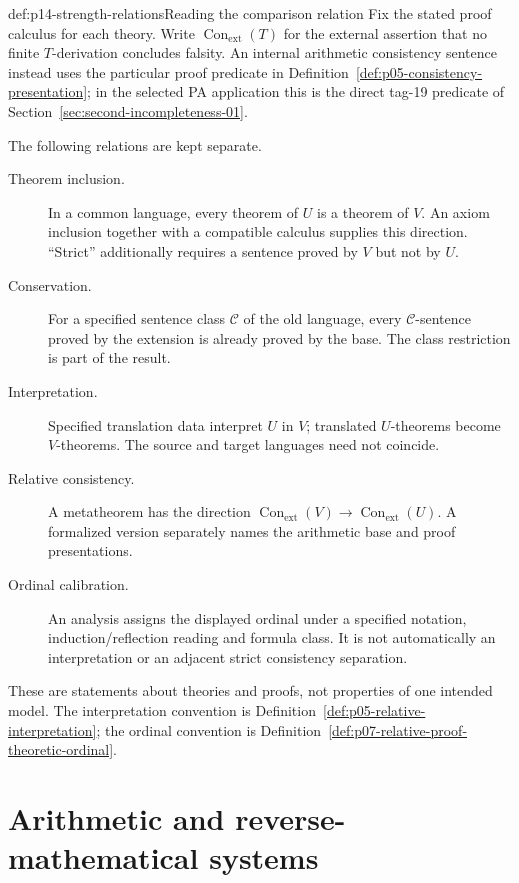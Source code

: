 \begin{hbconvention}{def:p14-strength-relations}{Reading the comparison relation}
Fix the stated proof calculus for each theory. Write
\(\operatorname{Con}_{\mathrm{ext}}(T)\) for the external assertion that no
finite \(T\)-derivation concludes falsity. An internal arithmetic consistency
sentence instead uses the particular proof predicate in
Definition~\ref{def:p05-consistency-presentation}; in the selected PA
application this is the direct tag-19 predicate of
Section~\ref{sec:second-incompleteness-01}.

The following relations are kept separate.
\begin{description}
 \item[Theorem inclusion.] In a common language, every theorem of \(U\)
 is a theorem of \(V\). An axiom inclusion together with a compatible
 calculus supplies this direction. ``Strict'' additionally requires a
 sentence proved by \(V\) but not by \(U\).
 \item[Conservation.] For a specified sentence class \(\mathcal C\) of
 the old language, every \(\mathcal C\)-sentence proved by the extension
 is already proved by the base. The class restriction is part of the result.
 \item[Interpretation.] Specified translation data interpret \(U\) in
 \(V\); translated \(U\)-theorems become \(V\)-theorems. The source
 and target languages need not coincide.
 \item[Relative consistency.] A metatheorem has the direction
 \(\operatorname{Con}_{\mathrm{ext}}(V)\to
 \operatorname{Con}_{\mathrm{ext}}(U)\). A formalized version separately
 names the arithmetic base and proof presentations.
 \item[Ordinal calibration.] An analysis assigns the displayed ordinal
 under a specified notation, induction/reflection reading and formula class.
 It is not automatically an interpretation or an adjacent strict
 consistency separation.
\end{description}
These are statements about theories and proofs, not properties of one
intended model. The interpretation convention is
Definition~\ref{def:p05-relative-interpretation}; the ordinal convention is
Definition~\ref{def:p07-relative-proof-theoretic-ordinal}.
\end{hbconvention}

\section{Arithmetic and reverse-mathematical systems}
\label{sec:p14-strength-arithmetic}

